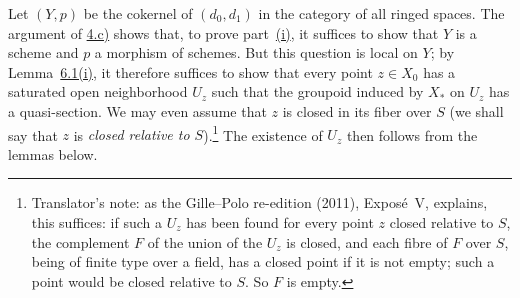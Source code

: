Let \((Y,p)\) be the cokernel of \((d_0,d_1)\) in the category of all
ringed spaces. The argument of \hyperref[proof:sga3-V-4.1-c]{4.c)} shows that, to prove
part~\hyperref[thm:sga3-V-7.1-i]{(i)}, it suffices to show that \(Y\) is a scheme and \(p\) a
morphism of schemes. But this question is local on \(Y\); by
Lemma~\hyperref[lem:sga3-V-6.1-i]{6.1(i)}, it therefore suffices to show that every point
\(z\in X_0\) has a saturated open neighborhood \(U_z\) such that the
groupoid induced by \(X_\ast\) on \(U_z\) has a quasi-section. We may even
assume that \(z\) is closed in its fiber over \(S\) (we shall say that \(z\)
is \emph{closed relative to \(S\)}).\footnote{Translator's note: as the Gille--Polo re-edition (2011), Exposé~V,
explains, this suffices: if such a \(U_z\) has been found for every point \(z\)
closed relative to \(S\), the complement \(F\) of the union of the \(U_z\) is
closed, and each fibre of \(F\) over \(S\), being of finite type over a field,
has a closed point if it is not empty; such a point would be closed relative
to \(S\). So \(F\) is empty.} The existence of \(U_z\) then follows
from the lemmas below.
